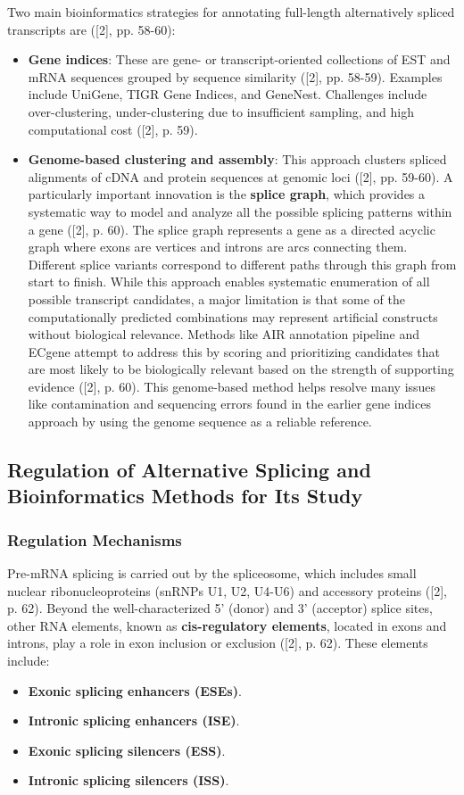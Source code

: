 \documentclass[12pt,a4paper]{article}
\begin{document}
Two main bioinformatics strategies for annotating full-length alternatively spliced transcripts are ([2], pp. 58-60):
\begin{itemize}
    \item \textbf{Gene indices}: These are gene- or transcript-oriented collections of EST and mRNA sequences grouped by sequence similarity ([2], pp. 58-59). Examples include UniGene, TIGR Gene Indices, and GeneNest. Challenges include over-clustering, under-clustering due to insufficient sampling, and high computational cost ([2], p. 59).
    \item \textbf{Genome-based clustering and assembly}: This approach clusters spliced alignments of cDNA and protein sequences at genomic loci ([2], pp. 59-60). A particularly important innovation is the \textbf{splice graph}, which provides a systematic way to model and analyze all the possible splicing patterns within a gene ([2], p. 60). The splice graph represents a gene as a directed acyclic graph where exons are vertices and introns are arcs connecting them. Different splice variants correspond to different paths through this graph from start to finish. While this approach enables systematic enumeration of all possible transcript candidates, a major limitation is that some of the computationally predicted combinations may represent artificial constructs without biological relevance. Methods like AIR annotation pipeline and ECgene attempt to address this by scoring and prioritizing candidates that are most likely to be biologically relevant based on the strength of supporting evidence ([2], p. 60). This genome-based method helps resolve many issues like contamination and sequencing errors found in the earlier gene indices approach by using the genome sequence as a reliable reference.
\end{itemize}

\subsection{Regulation of Alternative Splicing and Bioinformatics Methods for Its Study}

\subsubsection{Regulation Mechanisms}

Pre-mRNA splicing is carried out by the spliceosome, which includes small nuclear ribonucleoproteins (snRNPs U1, U2, U4-U6) and accessory proteins ([2], p. 62). Beyond the well-characterized 5' (donor) and 3' (acceptor) splice sites, other RNA elements, known as \textbf{cis-regulatory elements}, located in exons and introns, play a role in exon inclusion or exclusion ([2], p. 62). These elements include:
\begin{itemize}
    \item \textbf{Exonic splicing enhancers (ESEs)}.
    \item \textbf{Intronic splicing enhancers (ISE)}.
    \item \textbf{Exonic splicing silencers (ESS)}.
    \item \textbf{Intronic splicing silencers (ISS)}.
\end{itemize}
\end{document}
